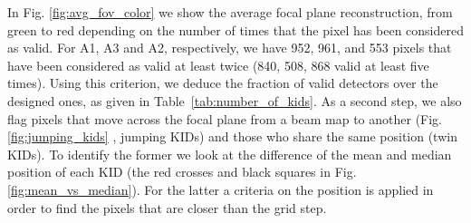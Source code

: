In Fig. \ref{fig:avg_fov_color} we show the average focal plane
reconstruction, from green to red depending on the number of times
that the pixel has been considered as valid. For A1, A3 and A2,
respectively, we have 952, 961, and 553 pixels that have been
considered as valid at least twice (840, 508, 868 valid at least five
times).
Using this criterion, we deduce the fraction of valid
detectors over the designed ones, as given in Table~\ref{tab:number_of_kids}. 
As a second step, we also flag pixels that move across the focal plane from a beam map to another (Fig. \ref{fig:jumping_kids} , jumping KIDs) and those who share the same position (twin KIDs). To identify the former we look at the difference of the mean and median position of each KID (the red crosses and black squares in Fig. \ref{fig:mean_vs_median}). For the latter a criteria on the position is applied in order to find the pixels that are closer than the grid step.

